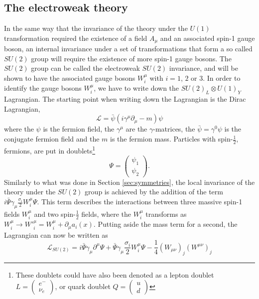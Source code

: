 \subsection*{The electroweak theory} 
\noindent\justify
In the same way that the invariance of the theory under the $U(1)$ transformation required the existence of a field $A_{\mu}$ and an associated spin-1 gauge boson, an internal invariance under a set of transformations that form a so called $SU(2)$ group will require the existence of more spin-1 gauge bosons. 
The $SU(2)$ group can be called the electroweak $SU(2)$ invariance, and will be shown to have the associated gauge bosons $W^{\mu}_{i}$ with $i=1$, $2$ or $3$.
In order to identify the gauge bosons $W^{\mu}_{i}$, we have to write down the $SU(2)_{L}\otimes U(1)_{Y}$ Lagrangian. 
The starting point when writing down the Lagrangian is the Dirac Lagrangian, 
\begin{equation}
\mathcal{L}=\bar{\psi}(i\gamma^{\mu}\partial_{\mu}-m)\psi
\end{equation}                                               
where the $\psi$ is the fermion field, the $\gamma^{\mu}$ are the $\gamma$-matrices, the $\bar{\psi}=\gamma^{0}\psi$ is the conjugate fermion field and the $m$ is the fermion mass. 
Particles with spin-$\frac{1}{2}$, fermions, are put in doublets\footnote{These doublets could have also been denoted as a lepton doublet $L=\begin{pmatrix} e^{-}\\ \nu_{e} \end{pmatrix}$, or quark doublet $Q=\begin{pmatrix} u\\ d \end{pmatrix}$}
\begin{equation}
\Psi=\begin{pmatrix} \psi_{1}\\ \psi_{2} \end{pmatrix}.
\end{equation}
Similarly to what was done in Section \ref{sec:symmetries}, the local invariance of the theory under the $SU(2)$ group is achieved by the addition of the term $i\bar{\Psi}\gamma_{\mu}\frac{\sigma_{i}}{2}W^{\mu}_{i}\Psi$. 
This term describes the interactions between three massive spin-1 fields $W_{i}^{\mu}$ and two spin-$\frac{1}{2}$ fields, where the $W_{i}^{\mu}$ transforms as $W_{i}^{\mu}\rightarrow W'^{\mu}_{i}=W_{i}^{\mu}+\partial_{\mu}a_{i}(x)$. 
Putting aside the mass term for a second, the Lagrangian can now be written as
\begin{equation}
\mathcal{L}_{SU(2)}=i\bar{\Psi}\gamma_{\mu}\partial^{\mu}\Psi+ \bar{\Psi}\gamma_{\mu}\frac{\sigma_{i}}{2}W_{i}^{\mu}\Psi-\frac{1}{4}(W_{\mu\nu})_{j}(W^{\mu\nu})_{j} 
\label{eq:dirac}
\end{equation}                                               
